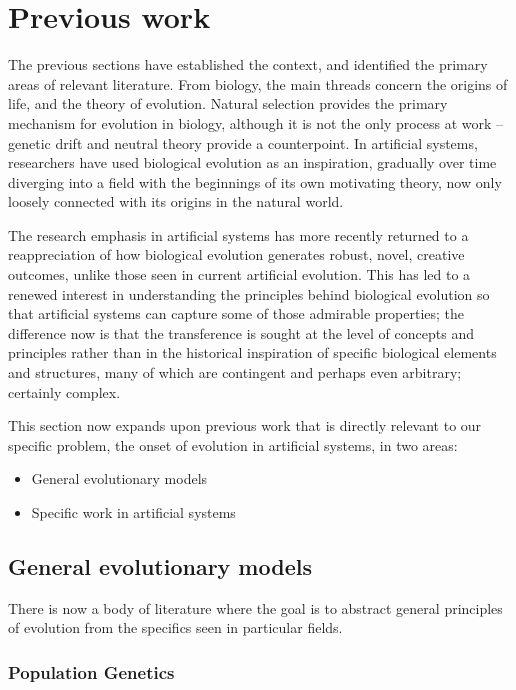 \chapter{Previous work}

The previous sections have established the context, and identified the primary areas of relevant literature. From biology, the main threads concern the origins of life, and the theory of evolution. Natural selection provides the primary mechanism for evolution in biology, although it is not the only process at work -- genetic drift and neutral theory provide a counterpoint. In artificial systems, researchers have used biological evolution as an inspiration, gradually over time diverging into a field with the beginnings of its own motivating theory, now only loosely connected with its origins in the natural world.

The research emphasis in artificial systems has more recently returned to a reappreciation of how biological evolution generates robust, novel, creative outcomes, unlike those seen in current artificial evolution. This has led to a renewed interest in understanding the principles behind biological evolution so that artificial systems can capture some of those admirable properties; the difference now is that the transference is sought at the level of concepts and principles rather than in the historical inspiration of specific biological elements and structures, many of which are contingent and perhaps even arbitrary; certainly complex.

This section now expands upon previous work that is directly relevant to our specific problem, the onset of evolution in artificial systems, in two areas:

\begin{itemize}
	\item General evolutionary models
	\item Specific work in artificial systems
\end{itemize}

\section{General evolutionary models}

There is now a body of literature where the goal is to abstract general principles of evolution from the specifics seen in particular fields.

\subsection{Population Genetics}

